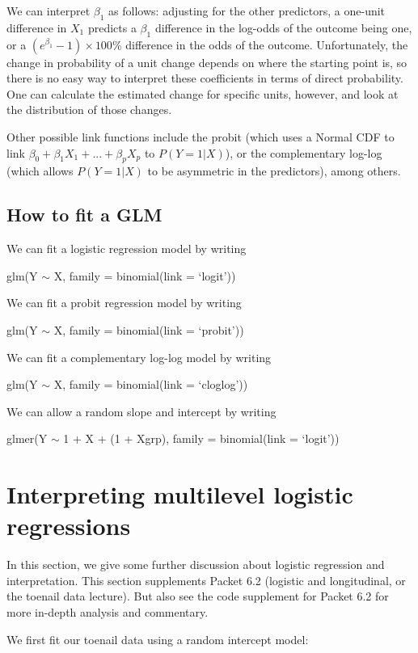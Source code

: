 \documentclass[
  letterpaper,
  DIV=11,
  numbers=noendperiod]{scrreprt}
\begin{document}
We can interpret \(\beta_1\) as follows: adjusting for the other
predictors, a one-unit difference in \(X_1\) predicts a \(\beta_1\)
difference in the log-odds of the outcome being one, or a
\((e^{\beta_1}-1)\times100\%\) difference in the odds of the outcome.
Unfortunately, the change in probability of a unit change depends on
where the starting point is, so there is no easy way to interpret these
coefficients in terms of direct probability. One can calculate the
estimated change for specific units, however, and look at the
distribution of those changes.

Other possible link functions include the probit (which uses a Normal
CDF to link \(\beta_0 + \beta_1X_1 + ... + \beta_pX_p\) to
\(P(Y=1|X)\)), or the complementary log-log (which allows \(P(Y = 1|X)\)
to be asymmetric in the predictors), among others.

\subsection{How to fit a GLM}\label{how-to-fit-a-glm}

We can fit a logistic regression model by writing

glm(Y \(\sim\) X, family = binomial(link = `logit'))

We can fit a probit regression model by writing

glm(Y \(\sim\) X, family = binomial(link = `probit'))

We can fit a complementary log-log model by writing

glm(Y \(\sim\) X, family = binomial(link = `cloglog'))

We can allow a random slope and intercept by writing

glmer(Y \(\sim\) 1 + X + (1 + X\textbar grp), family = binomial(link =
`logit'))

\section{Interpreting multilevel logistic
regressions}\label{interpreting-multilevel-logistic-regressions}

In this section, we give some further discussion about logistic
regression and interpretation. This section supplements Packet 6.2
(logistic and longitudinal, or the toenail data lecture). But also see
the code supplement for Packet 6.2 for more in-depth analysis and
commentary.

We first fit our toenail data using a random intercept model:
\end{document}
